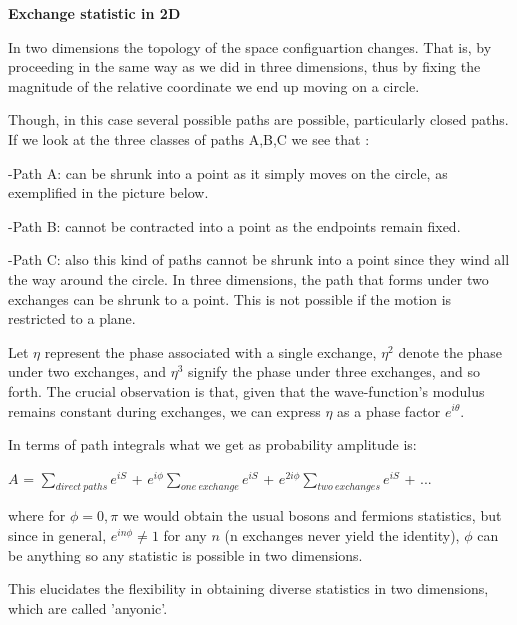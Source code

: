 \documentclass[12pt]{report}
\begin{document}
	\begin{minipage}{1 \textwidth}
		\textbf{Exchange statistic in 2D }\newline
		
		In two dimensions the topology of the space configuartion changes. That is, by proceeding in the same way as we did in three dimensions, thus by fixing the magnitude of the relative coordinate we end up moving on a circle.\newline
		
		Though, in this case several possible paths are possible, particularly closed paths.
		If we look at the three classes of paths A,B,C we see that :\newline
		
		-Path A: can be shrunk into a point as it simply moves on the circle, as exemplified in the picture below. \newline
		
		-Path B: cannot be contracted into a point as the endpoints remain fixed. \newline
		
		-Path C: also this kind of paths cannot be shrunk into a point since they wind all  the way around the circle. In three dimensions, the path that forms under two exchanges can be shrunk to a point. This is not possible if the motion is restricted to a plane.\newline
		
		
		
		Let $\eta$ represent the phase associated with a single exchange, $\eta^2$
		denote the phase under two exchanges, and $\eta^3$ signify the phase under three exchanges, and so forth. The crucial observation is that, given that the wave-function's modulus remains constant during exchanges, we can express $\eta$ as a phase factor $e^{i\theta}$. \newline
		
		In terms of path integrals what we get as probability amplitude is: \newline
		
		\begin{center}
			$A$ = $\sum_{direct \ paths} e^{iS}$ + $e^{i \phi} \sum_{ one \ exchange} e^{iS}$  + $e^{2i \phi} \sum_{ two \ exchanges} e^{iS}$  + ...
		\end{center}
		
		where for $ \phi = 0, \pi$ we would obtain the usual bosons and fermions statistics, but since in general, $e^{in\phi} \neq 1$ for any $n$ (n exchanges never yield the identity), $\phi$ can be anything so any statistic is possible in two dimensions.\newline
		
		This elucidates the flexibility in obtaining diverse statistics in two dimensions, which are called 'anyonic'.\newline
		
	\end{minipage}
	
\end{document}
